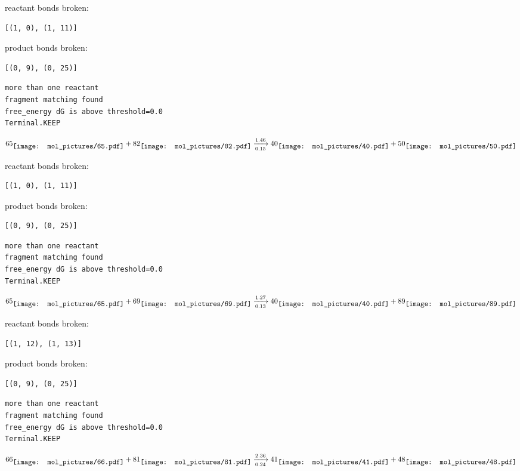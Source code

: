 \documentclass{article}
\begin{document}
reactant bonds broken:\begin{verbatim}
[(1, 0), (1, 11)]
\end{verbatim}
product bonds broken:\begin{verbatim}
[(0, 9), (0, 25)]
\end{verbatim}




\vspace{1cm}
\begin{verbatim}
more than one reactant
fragment matching found
free_energy dG is above threshold=0.0
Terminal.KEEP
\end{verbatim}
$$
65
\raisebox{-.5\height}{\texttt{[image: mol\_pictures/65.pdf]}}
+
82
\raisebox{-.5\height}{\texttt{[image: mol\_pictures/82.pdf]}}
\xrightarrow[0.15]{1.46}
40
\raisebox{-.5\height}{\texttt{[image: mol\_pictures/40.pdf]}}
+
50
\raisebox{-.5\height}{\texttt{[image: mol\_pictures/50.pdf]}}
$$


reactant bonds broken:\begin{verbatim}
[(1, 0), (1, 11)]
\end{verbatim}
product bonds broken:\begin{verbatim}
[(0, 9), (0, 25)]
\end{verbatim}




\vspace{1cm}
\begin{verbatim}
more than one reactant
fragment matching found
free_energy dG is above threshold=0.0
Terminal.KEEP
\end{verbatim}
$$
65
\raisebox{-.5\height}{\texttt{[image: mol\_pictures/65.pdf]}}
+
69
\raisebox{-.5\height}{\texttt{[image: mol\_pictures/69.pdf]}}
\xrightarrow[0.13]{1.27}
40
\raisebox{-.5\height}{\texttt{[image: mol\_pictures/40.pdf]}}
+
89
\raisebox{-.5\height}{\texttt{[image: mol\_pictures/89.pdf]}}
$$


reactant bonds broken:\begin{verbatim}
[(1, 12), (1, 13)]
\end{verbatim}
product bonds broken:\begin{verbatim}
[(0, 9), (0, 25)]
\end{verbatim}




\vspace{1cm}
\begin{verbatim}
more than one reactant
fragment matching found
free_energy dG is above threshold=0.0
Terminal.KEEP
\end{verbatim}
$$
66
\raisebox{-.5\height}{\texttt{[image: mol\_pictures/66.pdf]}}
+
81
\raisebox{-.5\height}{\texttt{[image: mol\_pictures/81.pdf]}}
\xrightarrow[0.24]{2.36}
41
\raisebox{-.5\height}{\texttt{[image: mol\_pictures/41.pdf]}}
+
48
\raisebox{-.5\height}{\texttt{[image: mol\_pictures/48.pdf]}}
$$
\end{document}
